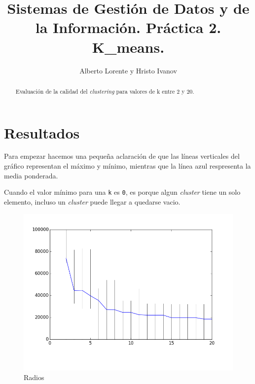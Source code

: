 \documentclass{article}
\begin{document}
\title{Sistemas de Gestión de Datos y de la Información. Práctica 2. \\ K\_means.}
\author{Alberto Lorente y Hristo Ivanov}
\maketitle

  \begin{abstract}
     Evaluación de la calidad del \emph{clustering} para valores de k entre 2 y 20.
  \end{abstract}

  \section{Resultados}
    Para empezar hacemos una pequeña aclaración de que las líneas verticales del gráfico
    representan el máximo y mínimo, mientras que la línea azul respresenta la media ponderada.
    \par
    Cuando el valor mínimo para una \texttt{k} es \texttt{0}, es porque algun \emph{cluster}
    tiene un solo elemento, incluso un \emph{cluster} puede llegar a quedarse vacio.    

    \begin{figure}[h]
      \centering
      \includegraphics[height=0.4\textheight, width=1\textwidth]{../k-means/Radios.png}
      \caption{Radios}
      \label{fig:radios}
    \end{figure}
\end{document}
